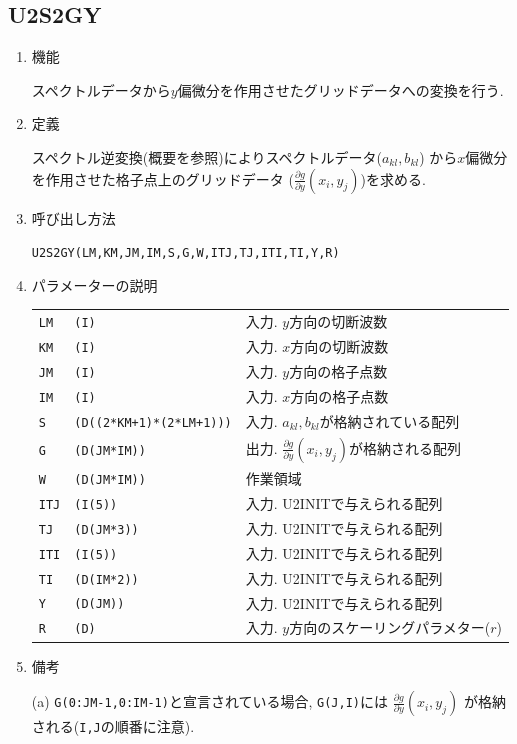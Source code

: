 \documentclass[a4j,fleqn]{jarticle}
\begin{document}
\subsection{U2S2GY}

\begin{enumerate}

\item 機能 

スペクトルデータから$y$偏微分を作用させたグリッドデータへの変換を行う.

\item 定義

スペクトル逆変換(概要を参照)によりスペクトルデータ($a_{kl},b_{kl}$)
から$x$偏微分を作用させた格子点上のグリッドデータ
($\frac{\partial g}{\partial y}(x_i,y_j)$)を求める.

\item 呼び出し方法 

{\tt U2S2GY(LM,KM,JM,IM,S,G,W,ITJ,TJ,ITI,TI,Y,R)}
  
\item パラメーターの説明

\begin{tabular}{lll}
{\tt LM} & {\tt (I)} & 入力. $y$方向の切断波数\\
{\tt KM} & {\tt (I)} & 入力. $x$方向の切断波数\\
{\tt JM} & {\tt (I)} & 入力. $y$方向の格子点数\\
{\tt IM} & {\tt (I)} & 入力. $x$方向の格子点数\\
{\tt S} & {\tt (D((2*KM+1)*(2*LM+1)))} & 入力. $a_{kl},b_{kl}$が格納されている配列\\
{\tt G} & {\tt (D(JM*IM))} & 出力. $\frac{\partial g}{\partial y}(x_i,y_j)$が格納される配列\\
{\tt W} & {\tt (D(JM*IM))} & 作業領域\\
{\tt ITJ} & {\tt (I(5))} & 入力. U2INITで与えられる配列\\
{\tt TJ} & {\tt (D(JM*3))} & 入力. U2INITで与えられる配列\\
{\tt ITI} & {\tt (I(5))} & 入力. U2INITで与えられる配列\\
{\tt TI} & {\tt (D(IM*2))} & 入力. U2INITで与えられる配列\\
{\tt Y} & {\tt (D(JM))} & 入力. U2INITで与えられる配列\\
{\tt R} & {\tt (D)} & 入力. $y$方向のスケーリングパラメター($r$)\\
\end{tabular}

\item 備考

(a) {\tt G(0:JM-1,0:IM-1)}と宣言されている場合, {\tt G(J,I)}には
    $\frac{\partial g}{\partial y}(x_i,y_j)$
    が格納される({\tt I,J}の順番に注意).

\end{enumerate}
\end{document}
